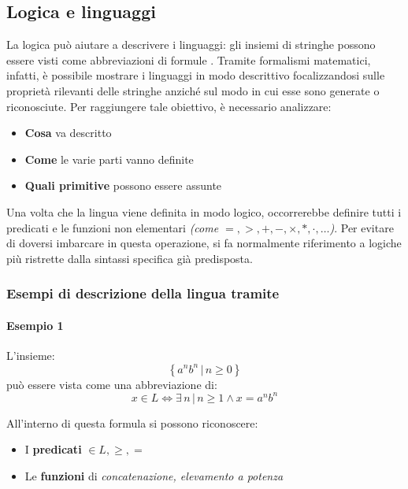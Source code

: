 \documentclass[italian, 10pt]{article}
\begin{document}
\subsection{Logica e linguaggi}
\label{sec:logica-linguaggi}

La logica può aiutare a descrivere i linguaggi: gli insiemi di stringhe possono essere visti come abbreviazioni di formule \FOL.
Tramite formalismi matematici, infatti, è possibile mostrare i linguaggi in modo descrittivo focalizzandosi sulle proprietà rilevanti delle stringhe anziché sul modo in cui esse sono generate o riconosciute.
Per raggiungere tale obiettivo, è necessario analizzare:

\begin{itemize}
  \item \textbf{Cosa} va descritto
  \item \textbf{Come} le varie parti vanno definite
  \item \textbf{Quali primitive} possono essere assunte
\end{itemize}

\bigskip
Una volta che la lingua viene definita in modo logico, occorrerebbe definire tutti i predicati e le funzioni non elementari \textit{(come \(=, >, +, -, \times, \ast, \cdot, \ldots\))}.
Per evitare di doversi imbarcare in questa operazione, si fa normalmente riferimento a logiche più ristrette dalla sintassi specifica già predisposta.

\subsubsection{Esempi di descrizione della lingua tramite \FOL}

\paragraph{Esempio 1}
\label{par:esempio-fol-1}

L'insieme:
\[ \left\{ a^n b^n \, | \, n \geq 0 \right\} \]
può essere vista come una abbreviazione di:
\[ x \in L \Leftrightarrow \exists \, n \, | \, n \geq 1 \land x = a^n b^n \]

All'interno di questa formula si possono riconoscere:

\begin{itemize}
  \item I \textbf{predicati} \(\in L, \geq, =\)
  \item Le \textbf{funzioni} di \textit{concatenazione, elevamento a potenza}
\end{itemize}
\end{document}
